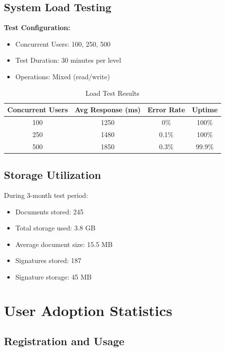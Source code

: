 \subsection{System Load Testing}

\textbf{Test Configuration:}
\begin{itemize}
\item Concurrent Users: 100, 250, 500
\item Test Duration: 30 minutes per level
\item Operations: Mixed (read/write)
\end{itemize}

\begin{table}[H]
\centering
\begin{tabular}{|c|c|c|c|}
\hline
\textbf{Concurrent Users} & \textbf{Avg Response (ms)} & \textbf{Error Rate} & \textbf{Uptime} \\
\hline
100 & 1250 & 0\% & 100\% \\
250 & 1480 & 0.1\% & 100\% \\
500 & 1850 & 0.3\% & 99.9\% \\
\hline
\end{tabular}
\caption{Load Test Results}
\end{table}

\subsection{Storage Utilization}

During 3-month test period:
\begin{itemize}
\item Documents stored: 245
\item Total storage used: 3.8 GB
\item Average document size: 15.5 MB
\item Signatures stored: 187
\item Signature storage: 45 MB
\end{itemize}

\section{User Adoption Statistics}

\subsection{Registration and Usage}

